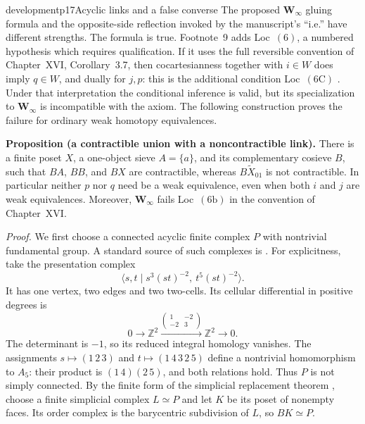 \begin{dcomment}{development}{p17}{Acyclic links and a false converse}
The proposed $\mathbf W_\infty$ gluing formula and the opposite-side reflection invoked by the manuscript's ``i.e.'' have different strengths. The formula is true. Footnote~9 adds Loc~$(6)$, a numbered hypothesis which requires qualification. If it uses the full reversible convention of Chapter~XVI, Corollary~3.7, then cocartesianness together with $i\in W$ does imply $q\in W$, and dually for $j,p$: this is the additional condition Loc~$(6\mathrm C)$ \citep[\S3, Corollary~3.7, ms.~26]{GrothendieckDerivateursXVI}. Under that interpretation the conditional inference is valid, but its specialization to $\mathbf W_\infty$ is incompatible with the axiom. The following construction proves the failure for ordinary weak homotopy equivalences.

\textbf{Proposition (a contractible union with a noncontractible link).}\ours
There is a finite poset $X$, a one-object sieve $A=\{a\}$, and its complementary cosieve $B$, such that $BA$, $BB$, and $BX$ are contractible, whereas $B\widetilde X_{01}$ is not contractible. In particular neither $p$ nor $q$ need be a weak equivalence, even when both $i$ and $j$ are weak equivalences. Moreover, $\mathbf W_\infty$ fails Loc~$(6\mathrm b)$ in the convention of Chapter~XVI.

\emph{Proof.} We first choose a connected acyclic finite complex $P$ with nontrivial fundamental group. A standard source of such complexes is \citet[Example~2.38]{Hatcher2002}. For explicitness, take the presentation complex
\[
 \langle s,t\mid s^3(st)^{-2},\ t^5(st)^{-2}\rangle.
\]
It has one vertex, two edges and two two-cells. Its cellular differential in positive degrees is
\[
 0\longrightarrow\mathbb Z^2
 \xrightarrow{\left(\begin{smallmatrix}1&-2\\-2&3\end{smallmatrix}\right)}
 \mathbb Z^2\longrightarrow0.
\]
The determinant is $-1$, so its reduced integral homology vanishes. The assignments $s\mapsto(1\,2\,3)$ and $t\mapsto(1\,4\,3\,2\,5)$ define a nontrivial homomorphism to $A_5$: their product is $(1\,4)(2\,5)$, and both relations hold. Thus $P$ is not simply connected. By the finite form of the simplicial replacement theorem \citep[Theorem~2C.5]{Hatcher2002}, choose a finite simplicial complex $L\simeq P$ and let $K$ be its poset of nonempty faces. Its order complex is the barycentric subdivision of $L$, so $BK\simeq P$.


\end{dcomment}
